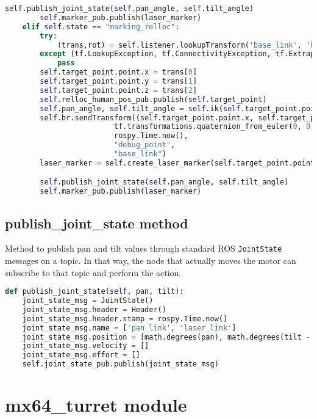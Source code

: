 \begin{lstlisting}[caption={Update Target Pose Point},label={lst:updatetargetpose},language=Python]
        self.publish_joint_state(self.pan_angle, self.tilt_angle)
        self.marker_pub.publish(laser_marker)
    elif self.state == "marking_relloc":
        try:
            (trans,rot) = self.listener.lookupTransform('base_link', 'human_footprint', rospy.Time(0))
        except (tf.LookupException, tf.ConnectivityException, tf.ExtrapolationException):
            pass
        self.target_point.point.x = trans[0]
        self.target_point.point.y = trans[1]
        self.target_point.point.z = trans[2]
        self.relloc_human_pos_pub.publish(self.target_point)
        self.pan_angle, self.tilt_angle = self.ik(self.target_point.point.x, self.target_point.point.y, self.target_point.point.z)
        self.br.sendTransform((self.target_point.point.x, self.target_point.point.y, self.target_point.point.z),
                         tf.transformations.quaternion_from_euler(0, 0, 0),
                         rospy.Time.now(),
                         "debug_point",
                         "base_link")
        laser_marker = self.create_laser_marker(self.target_point.point)

        self.publish_joint_state(self.pan_angle, self.tilt_angle)
        self.marker_pub.publish(laser_marker)
\end{lstlisting}
\subsection*{publish\_joint\_state method} \label{publishJointState}
Method to publish pan and tilt values through standard ROS \texttt{JointState} messages on a topic. In that way, the node that actually moves the motor can subscribe to that topic and perform the action.
\begin{lstlisting}[caption={Publish Joint State},label={lst:publishjointstate},language=Python]
def publish_joint_state(self, pan, tilt):
    joint_state_msg = JointState()
    joint_state_msg.header = Header()
    joint_state_msg.header.stamp = rospy.Time.now()
    joint_state_msg.name = ['pan_link', 'laser_link']
    joint_state_msg.position = [math.degrees(pan), math.degrees(tilt - np.pi/2)]
    joint_state_msg.velocity = []
    joint_state_msg.effort = []
    self.joint_state_pub.publish(joint_state_msg)
\end{lstlisting}

\section*{mx64\_turret module}
